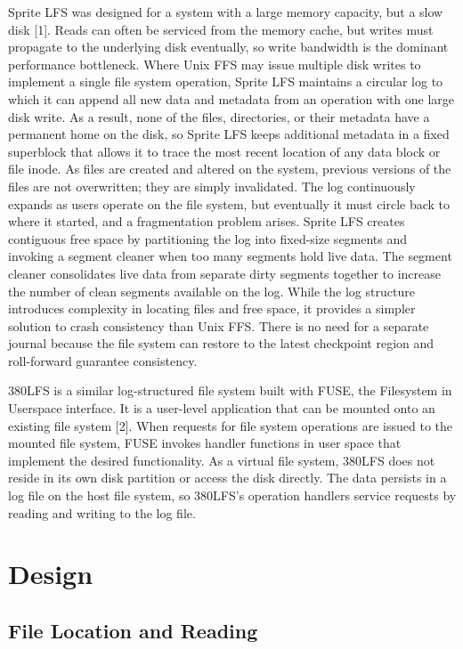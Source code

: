\documentclass{article}
\begin{document}
Sprite LFS was designed for a system with a large memory capacity, but a slow disk [1]. Reads can often be serviced from the memory cache, but writes must propagate to the underlying disk eventually, so write bandwidth is the dominant performance bottleneck. Where Unix FFS may issue multiple disk writes to implement a single file system operation, Sprite LFS maintains a circular log to which it can append all new data and metadata from an operation with one large disk write. As a result, none of the files, directories, or their metadata have a permanent home on the disk, so Sprite LFS keeps additional metadata in a fixed superblock that allows it to trace the most recent location of any data block or file inode. As files are created and altered on the system, previous versions of the files are not overwritten; they are simply invalidated. The log continuously expands as users operate on the file system, but eventually it must circle back to where it started, and a fragmentation problem arises. Sprite LFS creates contiguous free space by partitioning the log into fixed-size segments and invoking a segment cleaner when too many segments hold live data. The segment cleaner consolidates live data from separate dirty segments together to increase the number of clean segments available on the log. While the log structure introduces complexity in locating files and free space, it provides a simpler solution to crash consistency than Unix FFS. There is no need for a separate journal because the file system can restore to the latest checkpoint region and roll-forward guarantee consistency.

380LFS is a similar log-structured file system built with FUSE, the Filesystem in Userspace interface. It is a user-level application that can be mounted onto an existing file system [2]. When requests for file system operations are issued to the mounted file system, FUSE invokes handler functions in user space that implement the desired functionality. As a virtual file system, 380LFS does not reside in its own disk partition or access the disk directly. The data persists in a log file on the host file system, so 380LFS’s operation handlers service requests by reading and writing to the log file.

\section{Design}
\subsection{File Location and Reading}
\end{document}
